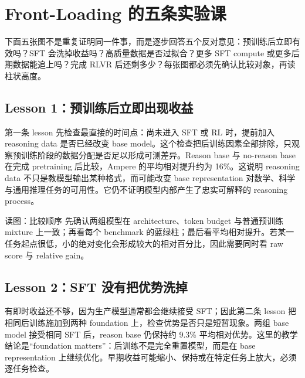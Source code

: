 \section{Front-Loading 的五条实验课}

下面五张图不是重复证明同一件事，而是逐步回答五个反对意见：预训练后立即有效吗？SFT 会洗掉收益吗？高质量数据是否过拟合？更多 SFT compute 或更多后期数据能追上吗？完成 RLVR 后还剩多少？每张图都必须先确认比较对象，再读柱状高度。

\subsection{Lesson 1：预训练后立即出现收益}

第一条 lesson 先检查最直接的时间点：尚未进入 SFT 或 RL 时，提前加入 reasoning data 是否已经改变 base model。这个检查把后训练因素全部排除，只观察预训练阶段的数据分配是否足以形成可测差异。Reason base 与 no-reason base 在完成 pretraining 后比较，Ampere 的平均相对提升约为 16\%。这说明 reasoning data 不只是教模型输出某种格式，而可能改变 base representation 对数学、科学与通用推理任务的可用性。它仍不证明模型内部产生了忠实可解释的 reasoning process。


\begin{knowledgebox}{读图：比较顺序}
先确认两组模型在 architecture、token budget 与普通预训练 mixture 上一致；再看每个 benchmark 的蓝绿柱；最后看平均相对提升。若某一任务起点很低，小的绝对变化会形成较大的相对百分比，因此需要同时看 raw score 与 relative gain。
\end{knowledgebox}

\subsection{Lesson 2：SFT 没有把优势洗掉}

有即时收益还不够，因为生产模型通常都会继续接受 SFT；因此第二条 lesson 把相同后训练施加到两种 foundation 上，检查优势是否只是短暂现象。两组 base model 接受相同 SFT 后，reason base 仍保持约 9.3\% 平均相对优势。这里的教学结论是“foundation matters”：后训练不是完全重置模型，而是在 base representation 上继续优化。早期收益可能缩小、保持或在特定任务上放大，必须逐任务检查。


